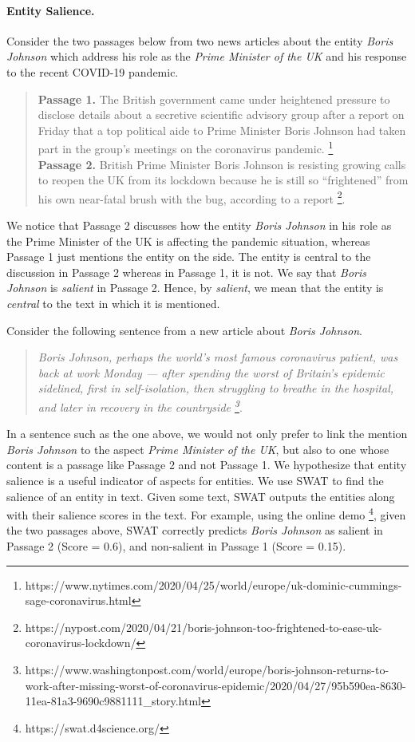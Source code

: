 \documentclass[sigconf,authordraft]{acmart}
\begin{document}
\paragraph{\textbf{Entity Salience.}} 
Consider the two passages below from two news articles about the entity \textit{Boris Johnson} which address his role as the \textit{Prime Minister of the UK} and his response to the recent COVID-19 pandemic.
\begin{quote}
\textbf{Passage 1.} The British government came under heightened pressure to disclose details about a secretive scientific advisory group after a report on Friday that a top political aide to Prime Minister Boris Johnson had taken part in the group’s meetings on the coronavirus pandemic. \footnote{https://www.nytimes.com/2020/04/25/world/europe/uk-dominic-cummings-sage-coronavirus.html}\\
\textbf{Passage 2.} British Prime Minister Boris Johnson is resisting growing calls to reopen the UK from its lockdown because he is still so “frightened” from his own near-fatal brush with the bug, according to a report \footnote{https://nypost.com/2020/04/21/boris-johnson-too-frightened-to-ease-uk-coronavirus-lockdown/}.
\end{quote}
We notice that Passage 2 discusses how the entity \textit{Boris Johnson} in his role as the Prime Minister of the UK is affecting the pandemic situation, whereas Passage 1 just mentions the entity on the side. The entity is central to the discussion in Passage 2 whereas in Passage 1, it is not. We say that \textit{Boris Johnson} is \textit{salient} in Passage 2. Hence, by \textit{salient}, we mean that the entity is \textit{central} to the text in which it is mentioned. 

Consider the following sentence from a new article about \textit{Boris Johnson}.

\begin{quote}
    \textit{Boris Johnson, perhaps the world's most famous coronavirus patient, was back at work Monday — after spending the worst of Britain's epidemic sidelined, first in self-isolation, then struggling to breathe in the hospital, and later in recovery in the countryside \footnote{https://www.washingtonpost.com/world/europe/boris-johnson-returns-to-work-after-missing-worst-of-coronavirus-epidemic/2020/04/27/95b590ea-8630-11ea-81a3-9690c9881111_story.html}}.
\end{quote}

In a sentence such as the one above, we would not only prefer to link the mention \textit{Boris Johnson} to the aspect \textit{Prime Minister of the UK}, but also to one whose content is a passage like Passage 2 and not Passage 1. We hypothesize that entity salience is a useful indicator of aspects for entities. We use SWAT \cite{swat}  to find the salience of an entity in text. Given some text, SWAT outputs the entities along with their salience scores in the text. For example, using the online demo \footnote{https://swat.d4science.org/}, given the two passages above, SWAT correctly predicts \textit{Boris Johnson} as salient in Passage 2 (Score = 0.6), and non-salient in Passage 1 (Score = 0.15). 
\end{document}
